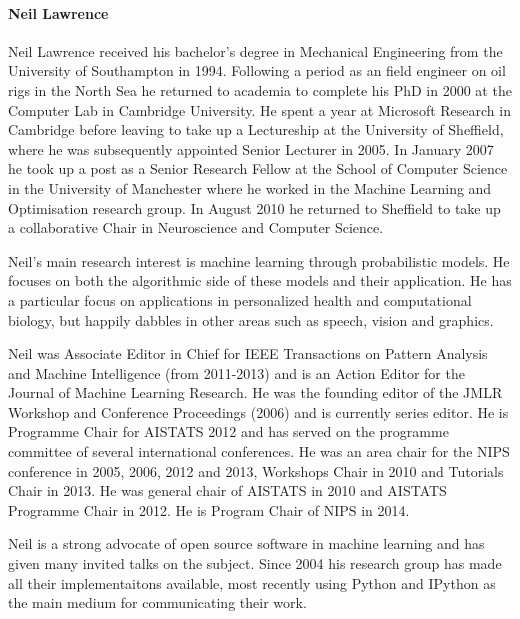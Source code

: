 \paragraph{Neil Lawrence}

%




Neil Lawrence received his bachelor's degree in Mechanical Engineering from the University of Southampton in 1994. Following a period as an field engineer on oil rigs in the North Sea he returned to academia to complete his PhD in 2000 at the Computer Lab in Cambridge University. He spent a year at Microsoft Research in Cambridge before leaving to take up a Lectureship at the University of Sheffield, where he was subsequently appointed Senior Lecturer in 2005. In January 2007 he took up a post as a Senior Research Fellow at the School of Computer Science in the University of Manchester where he worked in the Machine Learning and Optimisation research group. In August 2010 he returned to Sheffield to take up a collaborative Chair in Neuroscience and Computer Science.

Neil's main research interest is machine learning through probabilistic models. He focuses on both the algorithmic side of these models and their application. He has a particular focus on applications in personalized health and computational biology, but happily dabbles in other areas such as speech, vision and graphics.

Neil was Associate Editor in Chief for IEEE Transactions on Pattern Analysis and Machine Intelligence (from 2011-2013) and is an Action Editor for the Journal of Machine Learning Research. He was the founding editor of the JMLR Workshop and Conference Proceedings (2006) and is currently series editor. He is Programme Chair for AISTATS 2012 and has served on the programme committee of several international conferences. He was an area chair for the NIPS conference in 2005, 2006, 2012 and 2013, Workshops Chair in 2010 and Tutorials Chair in 2013. He was general chair of AISTATS in 2010 and AISTATS Programme Chair in 2012. He is Program Chair of NIPS in 2014.

Neil is a strong advocate of open source software in machine learning and has given many invited talks on the subject. Since 2004 his research group has made all their implementaitons available, most recently using Python and IPython as the main medium for communicating their work.
